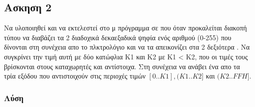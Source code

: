 \newpage \subsection*{Ασκηση 2}

Να υλοποιηθεί και να εκτελεστεί στο μ πρόγραμμα σε  που όταν προκαλείται διακοπή τύπου  να διαβάζει
τα 2 διαδοχικά δεκαεξαδικά ψηφία ενός αριθμού (0-255) που δίνονται στη συνέχεια απο το πλκτρολόγιο και να τα απεικονίζει στα 2 δεξιότερα
. Να συγκρίνει την τιμή αυτή με δύο κατώφλια Κ1 και Κ2 με Κ1 < Κ2, που οι τιμές τους βρίσκονται στους καταχωρητές 
 και  αντίστοιχα. Στη συνέχεια να ανάβει ένα απο τα τρία  εξόδου που αντιστοιχούν στις περιοχές τιμών $[0..K1],(K1..K2]$ και $(K2..FFH]$.

\subsubsection*{Λύση}

\inputminted{text}{./exercise2/exercise.8085}
